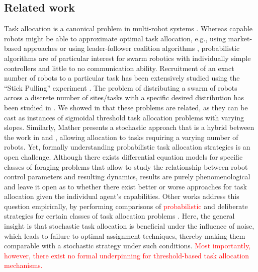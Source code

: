\documentclass[smallextended]{svjour3}       %
\newcommand{\edit}[1]{\textcolor{red}{#1}}
\begin{document}
\subsection{Related work}
Task allocation is a canonical problem in multi-robot systems \citep{Gerkey2004}. Whereas capable robots might be able to approximate optimal task allocation, e.g., using market-based approaches \citep{Amstutz2008,Vig2007,choi2009consensus} or using  leader-follower coalition algorithms \citep{Chen2011}, probabilistic algorithms are of particular interest for swarm robotics with individually simple controllers \citep{Dantu2012} and little to no communication ability. Recruitment of an exact number of robots to a particular task has been extensively studied using the ``Stick Pulling'' experiment \citep{Lerman2001,Martinoli2004}. The problem of distributing a swarm of robots across a discrete number of sites/tasks with a specific desired distribution has been studied in \citep{Berman2009,Correll2008}. We showed in \citep{Kanakia2014} that these problems are related, as they can be cast as instances of sigmoidal threshold task allocation problems with varying slopes. Similarly, Mather \citep{Mather2010} presents a stochastic approach that is a hybrid between the work in \citep{Berman2009} and \citep{Martinoli2004}, allowing allocation to tasks requiring a varying number of robots. Yet, formally understanding probabilistic task allocation strategies is an open challenge. Although there exists differential equation models for specific classes of foraging problems \citep{lerman2006analysis,liu2010modelling} that allow to study the relationship between robot control parameters and resulting dynamics, results are purely phenomenological and leave it open as to whether there exist better or worse approaches for task allocation given the individual agent's capabilities. Other works address this question empirically, by performing comparisons of \edit{probabilistic} and deliberate strategies for certain classes of task allocation problems \citep{Kalra2006,correll2007coordination}. Here, the general insight is that stochastic task allocation is beneficial under the influence of noise, which leads to failure to optimal assignment techniques, thereby making them comparable with a stochastic strategy under such conditions. \edit{Most importantly, however, there exist no formal underpinning for threshold-based task allocation mechanisms.}  
\end{document}
